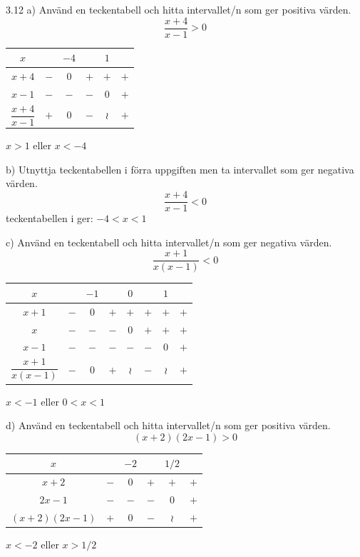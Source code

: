 \begin{task}{3.12 a)}
	Använd en teckentabell och hitta intervallet/n som ger positiva värden.
	\[\dfrac{x+4}{x-1}>0\]
	\begin{tabular}{c|c|c|c|c|c}
		$x$ & & $-4$ & & $1$ & \\ \hline
		$x+4$              & $-$ & $0$ & $+$ & $+$ & $+$ \\
		$x-1$              & $-$ & $-$ & $-$ & $0$ & $+$ \\ \hline
		$\dfrac{x+4}{x-1}$ & $+$ & $0$ & $-$ &$\wr$& $+$
	\end{tabular}

	\ans $x>1$ eller $x<-4$
\end{task}

\begin{task}{b)}
	Utnyttja teckentabellen i förra uppgiften men ta intervallet som ger negativa värden.
	\[\dfrac{x+4}{x-1}<0\]
	\ans teckentabellen i  ger: $-4<x<1$
\end{task}

\begin{task}{c)}
	Använd en teckentabell och hitta intervallet/n som ger negativa värden.
	\[\dfrac{x+1}{x(x-1)}<0\]
	\begin{tabular}{c|c|c|c|c|c|c|c}
		$x$ & & $-1$ & & $0$ & & $1$ & \\ \hline
		$x+1$                  & $-$ & $0$ & $+$ & $+$ & $+$ & $+$ & $+$ \\
		$x$                    & $-$ & $-$ & $-$ & $0$ & $+$ & $+$ & $+$ \\
		$x-1$                  & $-$ & $-$ & $-$ & $-$ & $-$ & $0$ & $+$ \\ \hline
		$\dfrac{x+1}{x(x-1)}$  & $-$ & $0$ & $+$ &$\wr$& $-$ &$\wr$& $+$ \\
	\end{tabular}
	
	\ans $x<-1$ eller $0<x<1$
\end{task}

\begin{task}{d)}
	Använd en teckentabell och hitta intervallet/n som ger positiva värden.
	\[(x+2)(2x-1) > 0\]
	\begin{tabular}{c|c|c|c|c|c}
		$x$ & & $-2$ & & $1/2$ & \\ \hline
		$x+2$         & $-$ & $0$ & $+$ & $+$ & $+$ \\
		$2x-1$        & $-$ & $-$ & $-$ & $0$ & $+$ \\ \hline
		$(x+2)(2x-1)$ & $+$ & $0$ & $-$ &$\wr$& $+$
	\end{tabular}
	
	\ans $x<-2$ eller $x>1/2$
\end{task}

